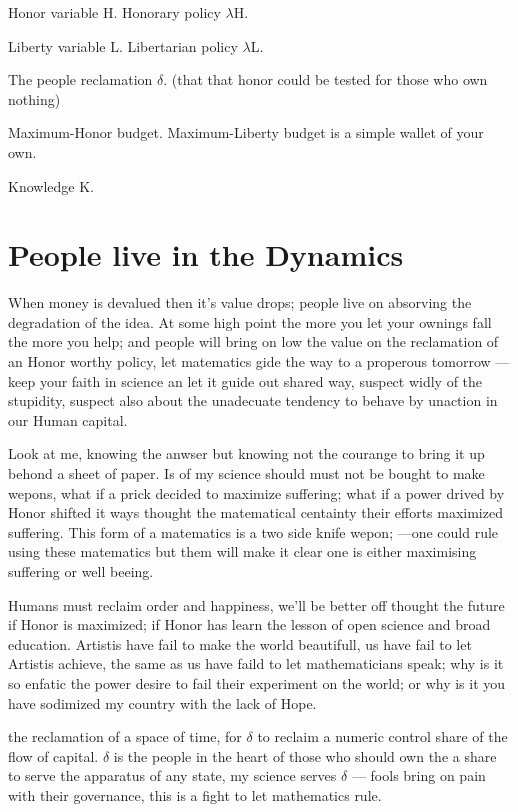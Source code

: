 \documentclass[a4paper,fleqn]{cas-sc}
\begin{document}
Honor variable H.
Honorary policy $\lambda$H.

Liberty variable L.
Libertarian policy $\lambda$L.

The people reclamation $\delta$. (that that honor could be tested for those who own nothing)

Maximum-Honor budget. 
Maximum-Liberty budget is a simple wallet of your own. 

Knowledge K.


\section{People live in the Dynamics}
When money is devalued then it's value drops; people live on absorving the degradation of the idea. 
At some high point the more you let your ownings fall the more you help; 
and people will bring on low the value on the reclamation of an Honor worthy policy, let matematics gide the way to a properous 
tomorrow ---keep your faith in science an let it guide out shared way, suspect widly of the stupidity, suspect also about 
the unadecuate tendency to behave by unaction in our Human capital. 

Look at me, knowing the anwser but knowing not the courange to bring it up behond a sheet of paper. 
Is of my science should must not be bought to make wepons, what if a prick decided to maximize suffering; 
what if a power drived by Honor shifted it ways thought the matematical centainty their efforts maximized suffering. 
This form of a matematics is a two side knife wepon; ---one could rule using these matematics but them will make it 
clear one is either maximising suffering or well beeing. 

Humans must reclaim order and happiness, we'll be better off thought the future if Honor is maximized; if Honor has learn the 
lesson of open science and broad education. Artistis have fail to make the world beautifull, us have fail to let 
Artistis achieve, the same as us have faild to let mathematicians speak; why is it so enfatic the power desire to fail their 
experiment on the world; or why is it you have sodimized my country with the lack of Hope. 

the reclamation of a space of time, for $\delta$ to reclaim a numeric control share of the flow of capital. 
$\delta$ is the people in the heart of those who should own the a share to serve the apparatus of any state, 
my science serves $\delta$ --- fools bring on pain with their governance, this is a fight to let mathematics rule. \\
\end{document}
